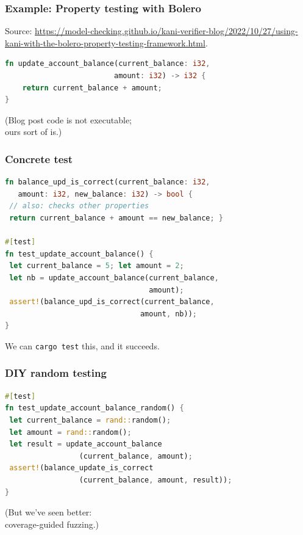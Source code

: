 \documentclass{beamer}
\newenvironment{changemargin}[1]{%
  \begin{list}{}{%
    \setlength{\topsep}{0pt}%
    \setlength{\leftmargin}{#1}%
    \setlength{\rightmargin}{1em}
    \setlength{\listparindent}{\parindent}%
    \setlength{\itemindent}{\parindent}%
    \setlength{\parsep}{\parskip}%
  }%
  \item[]}{\end{list}}
\begin{document}
\begin{frame}[fragile]
  \frametitle{Example: Property testing with Bolero}
{\scriptsize
  Source: \url{https://model-checking.github.io/kani-verifier-blog/2022/10/27/using-kani-with-the-bolero-property-testing-framework.html}.
}

\begin{lstlisting}[language=Rust]
fn update_account_balance(current_balance: i32,
                         amount: i32) -> i32 {
    return current_balance + amount;
}
\end{lstlisting}
\begin{changemargin}{1cm}
  \Large
(Blog post code is not executable; \\ ours sort of is.)
\end{changemargin}
\end{frame}

\begin{frame}[fragile]
  \frametitle{Concrete test}
\begin{lstlisting}[language=Rust]
fn balance_upd_is_correct(current_balance: i32,
   amount: i32, new_balance: i32) -> bool {
 // also: checks other properties
 return current_balance + amount == new_balance; }

#[test]
fn test_update_account_balance() {
 let current_balance = 5; let amount = 2;
 let nb = update_account_balance(current_balance, 
                                 amount);
 assert!(balance_upd_is_correct(current_balance,
                               amount, nb));
}
\end{lstlisting}
\begin{changemargin}{1cm}
  \Large
We can \texttt{cargo test} this, and it succeeds.
\end{changemargin}
\end{frame}

\begin{frame}[fragile]
  \frametitle{DIY random testing}
\begin{lstlisting}[language=Rust]
#[test]
fn test_update_account_balance_random() {
 let current_balance = rand::random();
 let amount = rand::random();
 let result = update_account_balance
                 (current_balance, amount);
 assert!(balance_update_is_correct
                 (current_balance, amount, result));
}
\end{lstlisting}
\begin{changemargin}{1cm}
  \Large
(But we've seen better: \\ \qquad coverage-guided fuzzing.)
\end{changemargin}

\end{frame}
\end{document}
